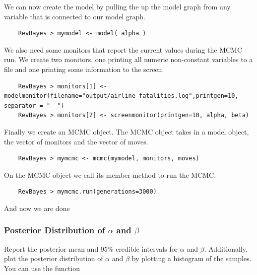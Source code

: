 We can now create the model by pulling the up the model graph from any variable that is connected to our model graph.
{\tt \begin{snugshade*}
\begin{lstlisting} 
    RevBayes > mymodel <- model( alpha )
\end{lstlisting}
\end{snugshade*}}
We also need some monitors that report the current values during the MCMC run.
We create two monitors, one printing all numeric non-constant variables to a file and one printing some information to the screen.
{\tt \begin{snugshade*}
\begin{lstlisting} 
    RevBayes > monitors[1] <- modelmonitor(filename="output/airline_fatalities.log",printgen=10, separator = "	")
    RevBayes > monitors[2] <- screenmonitor(printgen=10, alpha, beta)
\end{lstlisting}
\end{snugshade*}}
Finally we create an MCMC object.
The MCMC object takes in a model object, the vector of monitors and the vector of moves.
{\tt \begin{snugshade*}
\begin{lstlisting} 
    RevBayes > mymcmc <- mcmc(mymodel, monitors, moves)
\end{lstlisting}
\end{snugshade*}}
On the MCMC object we call its member method  to run the MCMC.
{\tt \begin{snugshade*}
\begin{lstlisting} 
    RevBayes > mymcmc.run(generations=3000)
\end{lstlisting}
\end{snugshade*}}
And now we are done {\LARGE \smiley}


\subsubsection*{Posterior Distribution of $\alpha$ and $\beta$}
 
Report the posterior mean and 95\% credible intervals for $\alpha$ and $\beta$. 
Additionally, plot the posterior distribution of $\alpha$ and $\beta$ by plotting a histogram of the samples. 
You can use the \R function

